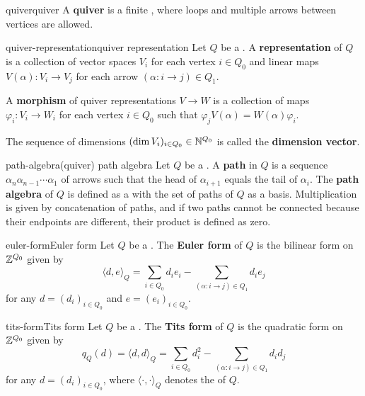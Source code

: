\begin{topic}{quiver}{quiver}
    A \textbf{quiver} is a finite , where loops and multiple arrows between vertices are allowed.
\end{topic}

\begin{topic}{quiver-representation}{quiver representation}
    Let $Q$ be a . A \textbf{representation} of $Q$ is a collection of vector spaces $V_i$ for each vertex $i \in Q_0$ and linear maps $V(\alpha) : V_i \to V_j$ for each arrow $(\alpha : i \to j) \in Q_1$.
    
    A \textbf{morphism} of quiver representations $V \to W$ is a collection of maps $\varphi_i : V_i \to W_i$ for each vertex $i \in Q_0$ such that $\varphi_j V(\alpha) = W(\alpha) \varphi_i$.
    
    The sequence of dimensions $(\dim V_i)_{i \in Q_0} \in \mathbb{N}^{Q_0}$ is called the \textbf{dimension vector}.
\end{topic}

\begin{topic}{path-algebra}{(quiver) path algebra}
    Let $Q$ be a . A \textbf{path} in $Q$ is a sequence $\alpha_n \alpha_{n - 1} \cdots \alpha_1$ of arrows such that the head of $\alpha_{i + 1}$ equals the tail of $\alpha_{i}$. The \textbf{path algebra} of $Q$ is defined as a  with the set of paths of $Q$ as a basis. Multiplication is given by concatenation of paths, and if two paths cannot be connected because their endpoints are different, their product is defined as zero.
\end{topic}

\begin{topic}{euler-form}{Euler form}
    Let $Q$ be a . The \textbf{Euler form} of $Q$ is the bilinear form on $\mathbb{Z}^{Q_0}$ given by
    \[ \langle d, e \rangle_Q = \sum_{i \in Q_0} d_i e_i - \sum_{(\alpha : i \to j) \in Q_1} d_i e_j \]
    for any $d = (d_i)_{i \in Q_0}$ and $e = (e_i)_{i \in Q_0}$.
\end{topic}

\begin{topic}{tits-form}{Tits form}
    Let $Q$ be a . The \textbf{Tits form} of $Q$ is the quadratic form on $\mathbb{Z}^{Q_0}$ given by
    \[ q_Q(d) = \langle d, d \rangle_Q = \sum_{i \in Q_0} d_i^2 - \sum_{(\alpha : i \to j) \in Q_1} d_i d_j \]
    for any $d = (d_i)_{i \in Q_0}$, where $\langle \cdot, \cdot \rangle_Q$ denotes the  of $Q$.
\end{topic}
